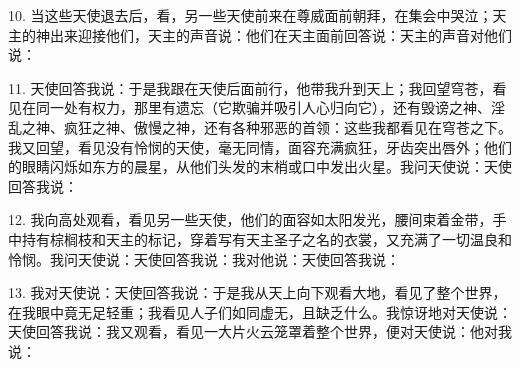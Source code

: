 10. 当这些天使退去后，看，另一些天使前来在尊威面前朝拜，在集会中哭泣；天主的神出来迎接他们，天主的声音说：他们在天主面前回答说：天主的声音对他们说：\par

11. 天使回答我说：于是我跟在天使后面前行，他带我升到天上；我回望穹苍，看见在同一处有权力，那里有遗忘（它欺骗并吸引人心归向它），还有毁谤之神、淫乱之神、疯狂之神、傲慢之神，还有各种邪恶的首领：这些我都看见在穹苍之下。我又回望，看见没有怜悯的天使，毫无同情，面容充满疯狂，牙齿突出唇外；他们的眼睛闪烁如东方的晨星，从他们头发的末梢或口中发出火星。我问天使说：天使回答我说：\par

12. 我向高处观看，看见另一些天使，他们的面容如太阳发光，腰间束着金带，手中持有棕榈枝和天主的标记，穿着写有天主圣子之名的衣裳，又充满了一切温良和怜悯。我问天使说：天使回答我说：我对他说：天使回答我说：\par

13. 我对天使说：天使回答我说：于是我从天上向下观看大地，看见了整个世界，在我眼中竟无足轻重；我看见人子们如同虚无，且缺乏什么。我惊讶地对天使说：天使回答我说：我又观看，看见一大片火云笼罩着整个世界，便对天使说：他对我说：\par

